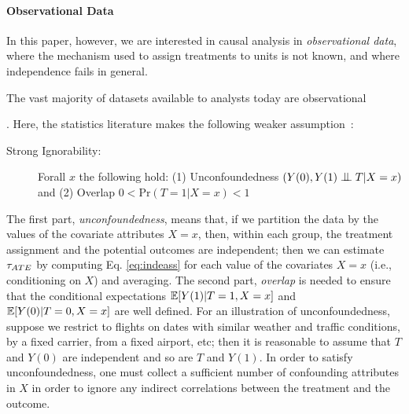 \paragraph*{Observational Data}
In this paper, however, we are interested in causal analysis in {\em
  observational data}, where the mechanism used to assign treatments
to units is not known, and where independence fails in general.
The vast majority of datasets
available to analysts today are observational
.  Here, the statistics literature makes the
following weaker assumption~\cite{Rubin1983b}:
\vspace{-0.1cm}
\begin{description}
\item[Strong Ignorability:] Forall $x$ the following hold: \newline
  (1) Unconfoundedness $({Y(0), Y(1) \bigCI T} | X=x)$ and \newline
  (2) Overlap $0 < \textrm{Pr}(T = 1 | X=x) < 1$
\end{description}

The first part, {\em unconfoundedness}, means that, if we partition
the data by the values of the covariate attributes $X=x$, then, within
each group, the treatment assignment and the potential outcomes are independent; then we can
estimate ${\tau_{ATE}}$ by computing Eq. \ref{eq:indeass} for each value of
the covariates $X=x$ (i.e., conditioning on $X$) and averaging.  The
second part, {\em overlap} is needed to ensure that the conditional
expectations $\mathbb{E}[Y(1)|T=1,X=x]$ and $\mathbb{E}[Y(0)|T=0,X=x]$ are well
defined.  For an illustration of unconfoundedness, suppose we restrict
to flights on dates with similar weather and traffic conditions, by a
fixed carrier, from a fixed airport, etc; then it is reasonable to
assume that $T$ and $Y(0)$ are independent and so are $T$ and $Y(1)$.
In order to satisfy unconfoundedness, one must collect a sufficient number
of confounding attributes in $X$ in order to ignore
any indirect correlations between the treatment and the outcome.


